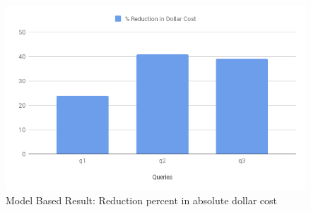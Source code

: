 \begin{figure}[h]
	\includegraphics[width=\linewidth]{ModelExp.png}
	\caption{Model Based Result: Reduction percent in absolute dollar cost}
	\label{fig:modelbaseddollarresult}
\end{figure}
